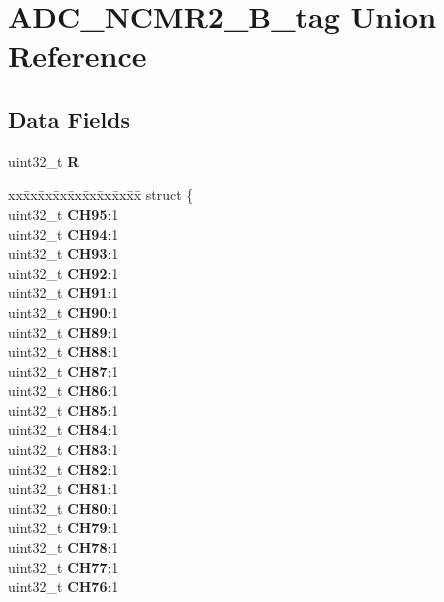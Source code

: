 \hypertarget{unionADC__NCMR2__32B__tag}{}\section{A\+D\+C\+\_\+\+N\+C\+M\+R2\+\_\+B\+\_\+tag Union Reference}
\label{unionADC__NCMR2__32B__tag}
\subsection*{Data Fields}
\begin{DoxyCompactItemize}
\item 
\mbox{\label{unionADC__NCMR2__32B__tag_aafbd4152db57292249ae7948a52badca}} 
uint32\+\_\+t {\bfseries R}
\item 
\mbox{\label{unionADC__NCMR2__32B__tag_a353beb30e0af4fe60f6083efa58948fa}} 
\begin{tabbing}
xx\=xx\=xx\=xx\=xx\=xx\=xx\=xx\=xx\=\kill
struct \{\\
\>uint32\_t {\bfseries CH95}:1\\
\>uint32\_t {\bfseries CH94}:1\\
\>uint32\_t {\bfseries CH93}:1\\
\>uint32\_t {\bfseries CH92}:1\\
\>uint32\_t {\bfseries CH91}:1\\
\>uint32\_t {\bfseries CH90}:1\\
\>uint32\_t {\bfseries CH89}:1\\
\>uint32\_t {\bfseries CH88}:1\\
\>uint32\_t {\bfseries CH87}:1\\
\>uint32\_t {\bfseries CH86}:1\\
\>uint32\_t {\bfseries CH85}:1\\
\>uint32\_t {\bfseries CH84}:1\\
\>uint32\_t {\bfseries CH83}:1\\
\>uint32\_t {\bfseries CH82}:1\\
\>uint32\_t {\bfseries CH81}:1\\
\>uint32\_t {\bfseries CH80}:1\\
\>uint32\_t {\bfseries CH79}:1\\
\>uint32\_t {\bfseries CH78}:1\\
\>uint32\_t {\bfseries CH77}:1\\
\>uint32\_t {\bfseries CH76}:1\\

\end{tabbing}
\end{DoxyCompactItemize}

